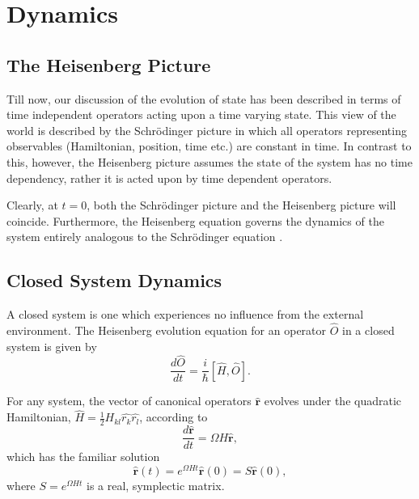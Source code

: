 \documentclass[11pt,a4paper]{article}
\numberwithin{equation}{section}
\begin{document}
	\section{Dynamics}
	\label{sec:dynamics}
	\subsection{The Heisenberg Picture}
	Till now, our discussion of the evolution of state has been described in terms of time independent operators acting upon a time varying state. This view of the world is described by the Schr{\"o}dinger picture in which all operators representing observables (Hamiltonian, position, time etc.) are constant in time. In contrast to this, however, the Heisenberg picture assumes the state of the system has no time dependency, rather it is acted upon by time dependent operators.
	
	Clearly, at $t=0$, both the Schr{\"o}dinger picture and the Heisenberg picture will coincide. Furthermore, the Heisenberg equation governs the dynamics of the system entirely analogous to the Schr{\"o}dinger equation \cite{Fujita}.
	
	
	\subsection{Closed System Dynamics}
	
	A closed system is one which experiences no influence from the external environment. The Heisenberg evolution equation for an operator $\hat{O}$ in a closed system is given by \cite{Fujita}
	\begin{equation*}
	\frac{d\hat{O}}{dt} = \frac{i}{\hbar}[\hat{H}, \hat{O}].
	\end{equation*}
	
	For any system, the vector of canonical operators $\mathbf{\hat{r}}$ evolves under the quadratic Hamiltonian, $\hat{H} = \frac{1}{2} H_{k l}\hat{r_k}\hat{r_l}$, according to \cite{Genoni16} 
	\begin{equation}\label{eq:31}
	\frac{d \mathbf{\hat{r}}}{dt} = \Omega H \mathbf{\hat{r}},
	\end{equation} which has the familiar solution
	\begin{equation}\label{eq:32}
	\mathbf{\hat{r}}(t) =e^{\Omega H t} \mathbf{\hat{r}}(0) = S\mathbf{\hat{r}}(0) ,
	\end{equation}
	where $S = e^{\Omega H t}$ is a real, symplectic matrix.
	
\end{document}
